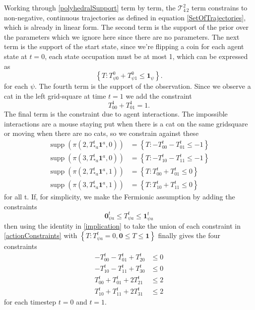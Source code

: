 \documentclass{article}
\DeclareMathOperator\supp{supp}
\begin{document}
Working through \eqref{polyhedralSupport} term by term, the $\mathcal{T}^2_{4\,2}$ term constrains to non-negative, continuous trajectories as defined in equation \eqref{SetOfTrajectories}, which is already in linear form. The second term is the support of the prior over the parameters which we ignore here since there are no parameters. The next term is the support of the start state, since we're flipping a coin for each agent state at $t=0$, each state occupation must be at most 1, which can be expressed as
\[
\left\{T:T^0_{\psi 0} + T^0_{\psi 1} \le \mathbf{1}_{\psi}\right\}.
\]
for each $\psi$. The fourth term is the support of the observation. Since we observe a cat in the left grid-square at time $t=1$ we add the constraint
\[
T^1_{0 0} + T^1_{0 1} = 1.
\]
The final term is the constraint due to agent interactions. The impossible interactions are a mouse staying put when there is a cat on the same gridsquare or moving when there are no cats, so we constrain against these
\begin{equation}
\begin{aligned}
\supp(\pi(2,T^t_{* a}\mathbf{1}^a,0)) &= \left\{ T: -T^t_{0 0} - T^t_{0 1} \le -1 \right\}\\
\supp(\pi(3,T^t_{* a}\mathbf{1}^a,0)) &= \left\{ T: -T^t_{1 0} - T^t_{1 1} \le -1 \right\}\\
\supp(\pi(2,T^t_{* a}\mathbf{1}^a,1)) &= \left\{ T: T^t_{0 0} + T^t_{0 1} \le 0 \right\}\\
\supp(\pi(3,T^t_{* a}\mathbf{1}^a,1)) &= \left\{ T: T^t_{1 0} + T^t_{1 1} \le 0 \right\}
\end{aligned}
\label{actionConstraints}
\end{equation}
for all t. If, for simplicity, we make the Fermionic assumption by adding the constraints
\[
\mathbf{0}^t_{\psi a} \le T^t_{\psi a} \le \mathbf{1}^t_{\psi a}
\]
then using the identity in \eqref{implication} to take the union of each constraint in \eqref{actionConstraints} with $\left\{T: T^t_{\psi a} = 0, \mathbf{0} \le T \le \mathbf{1}\right\}$ finally gives the four constraints
\[
\begin{aligned}
-T^t_{0 0} - T^t_{0 1} + T^t_{2 0} & \le 0\\
-T^t_{1 0} - T^t_{1 1} + T^t_{3 0} & \le 0\\
T^t_{0 0} + T^t_{0 1} + 2T^t_{2 1} & \le 2 \\
T^t_{1 0} + T^t_{1 1} + 2T^t_{3 1} & \le 2
\end{aligned}
\]
for each timestep $t=0$ and $t=1$.
\end{document}
